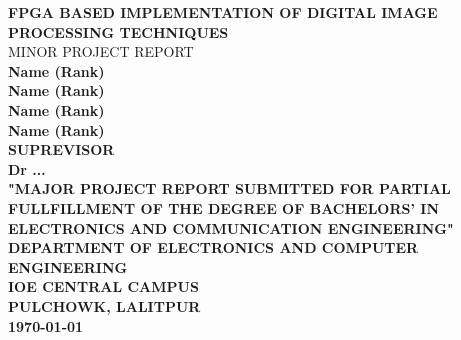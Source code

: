 \begin{titlepage}
\center
\Large \textbf{FPGA BASED IMPLEMENTATION OF DIGITAL IMAGE PROCESSING TECHNIQUES}\\[0.5cm]
\large MINOR PROJECT REPORT\\

\bfseries
Name (Rank)\\
Name (Rank)\\
Name (Rank)\\
Name (Rank)\\[0.5cm]

\textsc{SUPREVISOR}\\
\textbf{Dr ...} \\[1cm]

\textbf{"MAJOR PROJECT REPORT SUBMITTED FOR PARTIAL FULLFILLMENT OF THE DEGREE OF BACHELORS' IN ELECTRONICS AND COMMUNICATION ENGINEERING"}\\[0.5cm]
\textsc{DEPARTMENT OF ELECTRONICS AND COMPUTER ENGINEERING}\\[0.2cm]
\textbf{IOE CENTRAL CAMPUS}\\
\textbf{PULCHOWK, LALITPUR}\\[0.5cm]
\textbf{\large \today}
\end{titlepage}
